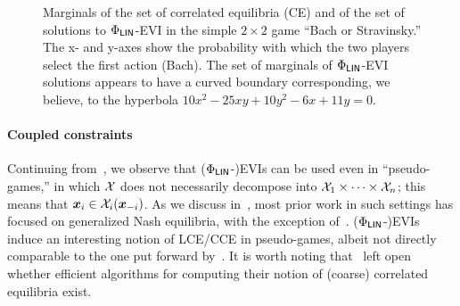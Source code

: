 \begin{figure}[t]
{}
    \caption{
        Marginals of the set of correlated equilibria (CE) and of the set of solutions to $\Phi_\mathsf{LIN}$-EVI in the simple $2 \times 2$ game ``Bach or Stravinsky.'' The x- and y-axes show the probability with which the two players select the first action (Bach). The set of marginals of $\Phi_\mathsf{LIN}$-EVI solutions appears to have a curved boundary corresponding, we believe, to the hyperbola $10 x^2 - 25 xy + 10 y^2 - 6x+11y=0$.
    }
    \label{fig:bach or stravinsky}
    \vspace{-3mm}
\end{figure}

\paragraph{Coupled constraints}
Continuing from~, we observe that ($\Phi_\mathsf{LIN}$-)EVIs can be used even in ``pseudo-games,'' in which ${\mathcal{X}}$ does not necessarily decompose into ${\mathcal{X}}_1 \times \dots \times {\mathcal{X}}_n$; this means that ${\bm{x}}_i \in {\mathcal{X}}_i({\bm{x}}_{-i})$. As we discuss in~, most prior work in such settings has focused on generalized Nash equilibria, with the exception of~\citet{Bernasconi23:Constrained}. ($\Phi_\mathsf{LIN}$-)EVIs induce an interesting notion of LCE/CCE in pseudo-games, albeit not directly comparable to the one put forward by~\citet{Bernasconi23:Constrained}. It is worth noting that~\citet{Bernasconi23:Constrained} left open whether efficient algorithms for computing their notion of (coarse) correlated equilibria exist.


